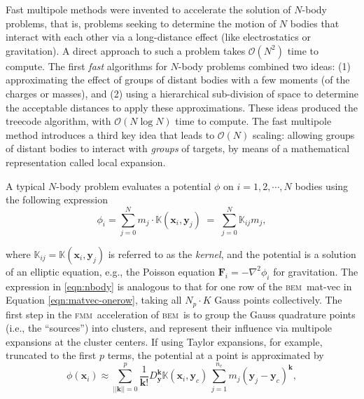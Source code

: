 \documentclass[final,3p,times]{elsarticle}
\newcommand{\K}{\mathbb{K}}
\newcommand{\bem}{\textsc{bem}\xspace}
\newcommand{\fmm}{\textsc{fmm}\xspace}
\newcommand{\bigO}{\mathcal{O}}
\renewcommand{\O}[1]{\mathcal{O}(#1)}
\newcommand{\vect}[1]{\mathbf{#1}}
\begin{document}
Fast multipole methods were invented to accelerate the solution of $N$-body problems, that is, problems seeking to determine the motion of $N$ bodies that interact with each other via a long-distance effect (like electrostatics or gravitation). A direct approach to such a problem takes $\O{N^{2}}$ time to compute. The first \emph{fast} algorithms for $N$-body problems \cite{Appel1985,BarnesHut1986} combined two ideas: (1) approximating the effect of groups of distant bodies with a few moments (of the charges or masses), and (2) using a hierarchical sub-division of space to determine the acceptable distances to apply these approximations.
 These ideas produced the treecode algorithm, with $\bigO(N\log N)$ time to compute.
The fast multipole method \cite{GreengardRokhlin1987} introduces a third key idea that leads to $\bigO(N)$ scaling: allowing groups of distant bodies to interact with \emph{groups} of targets, by means of a mathematical representation called local expansion.

A typical $N$-body problem evaluates a potential $\phi$ on $i=1, 2, \cdots, N$ bodies
using the following expression
%
\begin{equation}\label{eqn:nbody}
	\phi_{i} = \sum_{j=0}^{N} m_{j}\cdot\K(\vect{x}_{i},\vect{y}_{j}) \; = \; \sum_{j=0}^{N}\K_{ij}m_{j},
\end{equation}

\noindent where $\K_{ij} = \K(\vect{x}_{i},\vect{y}_{j})$ is referred to as the \emph{kernel}, and the potential is a solution of an elliptic equation, e.g., the Poisson equation $\vect{F}_i = - \nabla^2 \phi_i$ for gravitation. The expression in \eqref{eqn:nbody} is analogous to that for one row of the \bem\ mat-vec in Equation \eqref{eqn:matvec-onerow}, taking all $N_p \cdot K$ Gauss points collectively.
The first step in the \fmm\ acceleration of \bem\ is to group the Gauss quadrature points (i.e., the ``sources'') into clusters, and represent their influence via multipole expansions at the cluster centers. If using Taylor expansions, for example, truncated to the first $p$ terms, the potential at a point is approximated by
%
\begin{equation}
	\phi(\vect{x}_i) \approx \sum_{||\vect{k}||=0}^{p}\frac{1}{\vect{k}!}D^{\vect{k}}_{\vect{y}} \K(\vect{x}_i,\vect{y}_c)\, \sum_{j=1}^{n_c} m_j (\vect{y}_j-\vect{y}_c)^{\vect{k}},
	\label{eqn:cartesian_multipole}
\end{equation}
\end{document}
